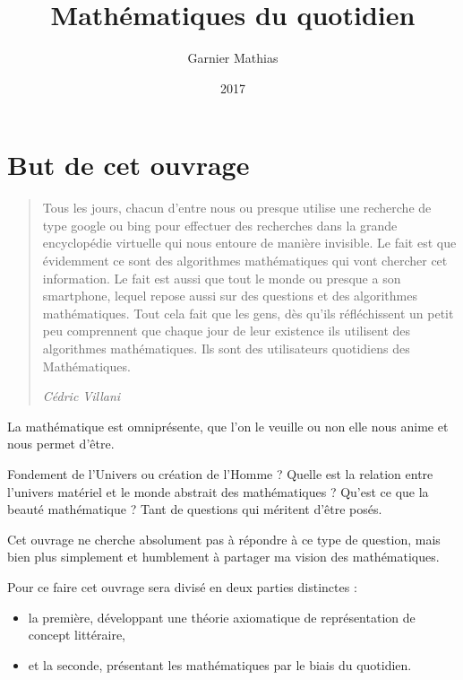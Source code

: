 \documentclass[12pt]{article} %
\title{\vspace{\fill}Mathématiques du quotidien\vspace{\fill}}
\author{Garnier Mathias}
\date{2017}
\begin{document}
\maketitle

\newpage
\tableofcontents
\newpage

\section{But de cet ouvrage}
        \begin{quote}
           Tous les jours, chacun d'entre nous ou presque utilise une recherche de type google ou bing pour effectuer des recherches dans la grande encyclopédie virtuelle qui nous entoure de manière invisible. Le fait est que évidemment ce sont des algorithmes mathématiques qui vont chercher cet information. Le fait est aussi que tout le monde ou presque a son smartphone, lequel repose aussi sur des questions et des algorithmes mathématiques. Tout cela fait que les gens, dès qu'ils réfléchissent un petit peu comprennent que chaque jour de leur existence ils utilisent des algorithmes mathématiques. Ils sont des utilisateurs quotidiens des Mathématiques. \newline
           
            \par \noindent \hfill \emph{Cédric Villani}
        \end{quote}

La mathématique est omniprésente, que l'on le veuille ou non elle nous anime et nous permet d'être.

 Fondement de l'Univers ou création de l'Homme ?  Quelle est la relation entre l'univers matériel et le monde abstrait des mathématiques ? Qu'est ce que la beauté mathématique ? \newline
Tant de questions qui méritent d'être posés.

Cet ouvrage ne cherche absolument pas à répondre à ce type de question, mais bien plus simplement et humblement à partager ma vision des mathématiques.

Pour ce faire cet ouvrage sera divisé en deux parties distinctes : 
\begin{itemize}
\item la première, développant une théorie axiomatique de représentation de concept littéraire,
\item et la seconde, présentant les mathématiques par le biais du quotidien.
\end{itemize}
\end{document}
